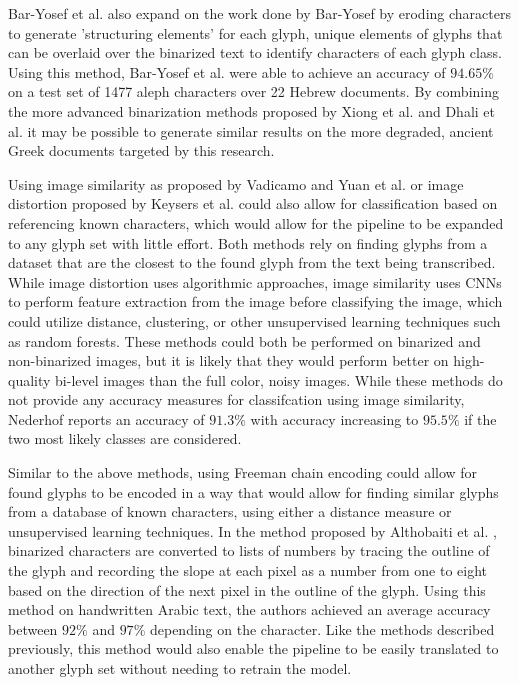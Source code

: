 Bar-Yosef et al.\cite{Bar-Yosef2007} also expand on the work done by Bar-Yosef by eroding characters to generate 'structuring elements' for each glyph, unique elements of glyphs that can be overlaid over the binarized text to identify characters of each glyph class. Using  this method, Bar-Yosef et al. were able to achieve an accuracy of $94.65\%$ on a test set of 1477 aleph characters over 22 Hebrew documents. By combining the more advanced binarization methods proposed by Xiong et al.\cite{Xiong} and Dhali et al.\cite{Dhali2019} it may be possible to generate similar results on the more degraded, ancient Greek documents targeted by this research.

Using image similarity as proposed by Vadicamo \cite{Vadicamo} and Yuan et al. \cite{Yuan} or image distortion proposed by Keysers et al. \cite{Keysers} could also allow for classification based on referencing known characters, which would allow for the pipeline to be expanded to any glyph set with little effort. Both methods rely on finding glyphs from a dataset that are the closest to the found glyph from the text being transcribed. While image distortion uses algorithmic approaches, image similarity uses CNNs to perform feature extraction from the image before classifying the image, which could utilize distance, clustering, or other unsupervised learning techniques such as random forests.
These methods could both be performed on binarized and non-binarized images, but it is likely that they would perform better on high-quality bi-level images than the full color, noisy images. While these methods do not provide any accuracy measures for classifcation using image similarity, Nederhof \cite{Nederhof} reports an accuracy of $91.3\%$ with accuracy increasing to $95.5\%$ if the two most likely classes are considered.

Similar to the above methods, using Freeman chain encoding could allow for found glyphs to be encoded in a way that would allow for finding similar glyphs from a database of known characters, using either a distance measure or unsupervised learning techniques. In the method proposed by Althobaiti et al. \cite{Althobaiti}, binarized characters are converted to lists of numbers by tracing the outline of the glyph and recording the slope at each pixel as a number from one to eight based on the direction of the next pixel in the outline of the glyph. Using this method on handwritten Arabic text, the authors achieved an average accuracy between $92\%$ and $97\%$ depending on the character. Like the methods described previously, this method would also enable the pipeline to be easily translated to another glyph set without needing to retrain the model.


